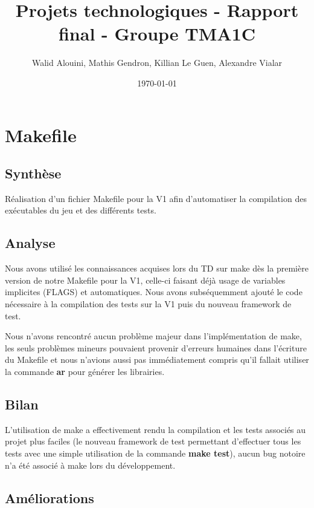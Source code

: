 \documentclass[12pt]{article}
\begin{document}
\title{Projets technologiques - Rapport final - Groupe TMA1C}
\author{Walid Alouini, Mathis Gendron, Killian Le Guen, Alexandre Vialar}
\date{\today}

\maketitle
\tableofcontents



\section{Makefile}
\subsection{Synthèse}

Réalisation d'un fichier Makefile pour la V1 afin d'automatiser la compilation des exécutables du jeu et des différents tests.

\subsection{Analyse}

Nous avons utilisé les connaissances acquises lors du TD sur make dès la première version
de notre Makefile pour la V1, celle-ci faisant déjà usage de variables implicites (FLAGS) et automatiques.
Nous avons subséquemment ajouté le code nécessaire à la compilation des tests sur la V1 puis du nouveau
framework de test.

Nous n'avons rencontré aucun problème majeur dans l'implémentation de make, les seuls
problèmes mineurs pouvaient provenir d'erreurs humaines dans l'écriture du Makefile et
nous n'avions aussi pas immédiatement compris qu'il fallait utiliser la commande \textbf{ar}
pour générer les librairies.

\subsection{Bilan}

L'utilisation de make a effectivement rendu la compilation et les tests associés au projet plus faciles 
(le nouveau framework de test permettant d'effectuer tous les tests avec une simple utilisation de la 
commande \textbf{make test}), aucun bug notoire n'a été associé à make lors du développement.

\subsection{Améliorations}
\end{document}
